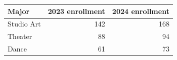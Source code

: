 \begin{tabular}{|l|r|r|}
\hline
Major & 2023 enrollment & 2024 enrollment \\
\hline
Studio Art & 142 & 168 \\
Theater & 88 & 94 \\
Dance & 61 & 73 \\
\hline
\end{tabular}
